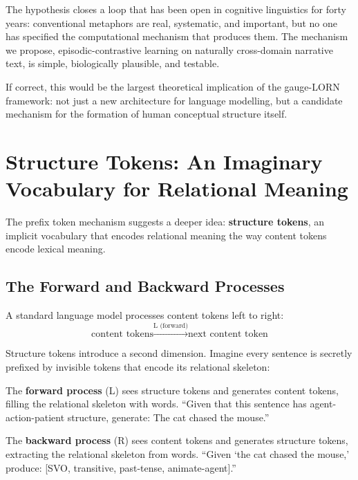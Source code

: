 \documentclass[11pt, a4paper]{article}
\theoremstyle{plain}
\theoremstyle{definition}
\theoremstyle{remark}
\begin{document}
The hypothesis closes a loop that has been open in cognitive linguistics for forty years: conventional metaphors are real, systematic, and important, but no one has specified the computational mechanism that produces them.
The mechanism we propose, episodic-contrastive learning on naturally cross-domain narrative text, is simple, biologically plausible, and testable.

If correct, this would be the largest theoretical implication of the gauge-LORN framework: not just a new architecture for language modelling, but a candidate mechanism for the formation of human conceptual structure itself.


\section{Structure Tokens: An Imaginary Vocabulary for Relational Meaning}
\label{app:structure-tokens}

The prefix token mechanism suggests a deeper idea: \textbf{structure tokens}, an implicit vocabulary that encodes relational meaning the way content tokens encode lexical meaning.

\subsection{The Forward and Backward Processes}

A standard language model processes content tokens left to right:
\begin{equation}
\text{content tokens} \xrightarrow{\text{L (forward)}} \text{next content token}
\end{equation}

Structure tokens introduce a second dimension.
Imagine every sentence is secretly prefixed by invisible tokens that encode its relational skeleton:
\begin{equation}
[\underbrace{s_1, s_2, \ldots, s_K}_{\text{structure tokens}},\; \underbrace{w_1, w_2, \ldots, w_N}_{\text{content tokens}}]
\end{equation}

The \textbf{forward process} (L) sees structure tokens and generates content tokens, filling the relational skeleton with words.
``Given that this sentence has agent-action-patient structure, generate: The cat chased the mouse.''

The \textbf{backward process} (R) sees content tokens and generates structure tokens, extracting the relational skeleton from words.
``Given `the cat chased the mouse,' produce: [SVO, transitive, past-tense, animate-agent].''
\end{document}
